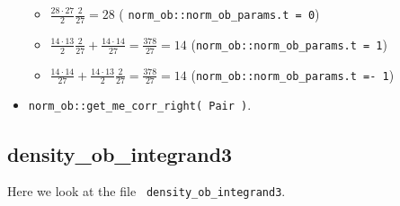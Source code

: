 \documentclass[10pt]{article}
\begin{document}
\begin{itemize}
{	\begin{itemize}
	\item $ \frac{ 28 \cdot 27}{2} \frac{2}{27} = 28$ ( \texttt{norm\_ob::norm\_ob\_params.t = 0}) 
	\item $ \frac{ 14 \cdot 13}{2} \frac{2}{27} + \frac{14 \cdot 14 }{27} = \frac{378}{27} = 14 $ (\texttt{norm\_ob::norm\_ob\_params.t~=~1}) \\
	\item $ \frac{14 \cdot 14 }{27} + \frac{ 14 \cdot 13}{2} \frac{2}{27} = \frac{378}{27} = 14 $ (\texttt{norm\_ob::norm\_ob\_params.t~=-~1}) \\
	\end{itemize}
	}
	\item \texttt{norm\_ob::get\_me\_corr\_right( Pair )}.
\end{itemize}

\subsection{ density\_ob\_integrand3 }
Here we look at the file \texttt{ density\_ob\_integrand3}.
\end{document}
